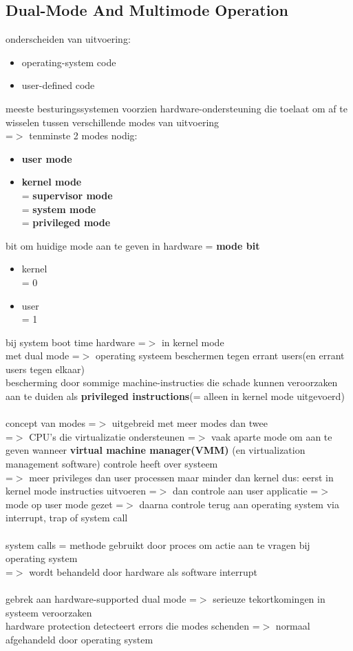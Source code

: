 \documentclass{report}
\begin{document}
\subsection{Dual-Mode And Multimode Operation}
onderscheiden van uitvoering:
\begin{itemize}
\item operating-system code
\item user-defined code
\end{itemize}
meeste besturingssystemen voorzien hardware-ondersteuning die toelaat om af te wisselen tussen verschillende modes van uitvoering
\\=$>$ tenminste 2 modes nodig:
\begin{itemize}
\item \textbf{user mode}
\item \textbf{kernel mode}
\\= \textbf{supervisor mode}
\\= \textbf{system mode}
\\= \textbf{privileged mode}
\end{itemize}
bit om huidige mode aan te geven in hardware = \textbf{mode bit}
\begin{itemize}
\item kernel
\\ = 0
\item user
\\ = 1
\end{itemize}
bij system boot time hardware =$>$ in kernel mode
\\met dual mode =$>$ operating systeem beschermen tegen errant users(en errant users tegen elkaar)
\\bescherming door sommige machine-instructies die schade kunnen veroorzaken aan te duiden als \textbf{privileged instructions}(= alleen in kernel mode uitgevoerd)
\\
\\concept van modes =$>$ uitgebreid met meer modes dan twee
\\=$>$ CPU's die virtualizatie ondersteunen =$>$ vaak aparte mode om aan te geven wanneer \textbf{virtual machine manager(VMM)} (en virtualization management software) controle heeft over systeem
\\=$>$ meer privileges dan user processen maar minder dan kernel
dus: eerst in kernel mode instructies uitvoeren =$>$ dan controle aan user applicatie =$>$ mode op user mode gezet =$>$ daarna controle terug aan operating system via interrupt, trap of system call
\\
\\system calls = methode gebruikt door proces om actie aan te vragen bij operating system
\\=$>$ wordt behandeld door hardware als software interrupt
\\
\\gebrek aan hardware-supported dual mode =$>$ serieuze tekortkomingen in systeem veroorzaken
\\hardware protection detecteert errors die modes schenden =$>$ normaal afgehandeld door operating system
\end{document}
